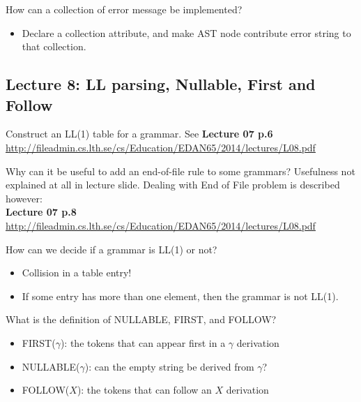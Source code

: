 \documentclass[11pt]{beamer}
\begin{document}
\begin{frame}
\begin{block}{How can a collection of error message be implemented? }

\begin{itemize}
\item Declare a collection attribute, and make AST node contribute error string to that collection.
\end{itemize}

\end{block}
\end{frame}

\subsection{Lecture 8: LL parsing, Nullable, First and Follow}
\begin{frame}
\begin{block}{Construct an LL(1) table for a grammar.}
See \textbf{Lecture 07 p.6} \url{http://fileadmin.cs.lth.se/cs/Education/EDAN65/2014/lectures/L08.pdf}
\end{block}

\begin{block}{Why can it be useful to add an end-of-file rule to some grammars?}
Usefulness not explained at all in lecture slide. Dealing with End of File problem is described however:\\ \textbf{Lecture 07 p.8} \url{http://fileadmin.cs.lth.se/cs/Education/EDAN65/2014/lectures/L08.pdf}
\end{block}
\end{frame}

\begin{frame}
\begin{block}{How can we decide if a grammar is LL(1) or not?}
\begin{itemize}
\item Collision in a table entry!
\item If some entry has more than one element, then the grammar is not LL(1).
\end{itemize}
\end{block}

\begin{block}{What is the definition of NULLABLE, FIRST, and FOLLOW?}
\begin{itemize}
\item FIRST($\gamma$): the tokens that can appear first in a $\gamma$ derivation 
\item NULLABLE($\gamma$): can the empty string be derived from $\gamma$? 
\item FOLLOW($X$): the tokens that can follow an $X$ derivation
\end{itemize}
\end{block}
\end{frame}
\end{document}
